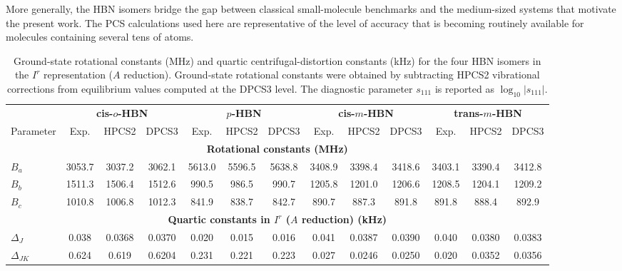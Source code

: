 \documentclass[aip,jcp,reprint,floatfix]{revtex4-2}
\begin{document}
More generally, the HBN isomers bridge the gap between classical
small-molecule benchmarks and the medium-sized systems that motivate
the present work. The PCS calculations used here are representative of
the level of accuracy that is becoming routinely available for
molecules containing several tens of atoms.

\begin{table}[t]
\centering
\scriptsize
\setlength{\tabcolsep}{4pt}

\caption{Ground-state rotational constants (MHz) and quartic
centrifugal-distortion constants (kHz) for the four HBN isomers in the
$I^r$ representation ($A$ reduction). Ground-state rotational
constants were obtained by subtracting HPCS2 vibrational corrections
from equilibrium values computed at the DPCS3 level. The diagnostic
parameter $s_{111}$ is reported as $\log_{10}|s_{111}|$.}

\begin{tabular}{lccc ccc ccc ccc}
\toprule
& \multicolumn{3}{c}{\textbf{cis-$o$-HBN}}
& \multicolumn{3}{c}{\textbf{$p$-HBN}}
& \multicolumn{3}{c}{\textbf{cis-$m$-HBN}}
& \multicolumn{3}{c}{\textbf{trans-$m$-HBN}} \\
\cmidrule(lr){2-4}
\cmidrule(lr){5-7}
\cmidrule(lr){8-10}
\cmidrule(lr){11-13}
Parameter
& Exp. & HPCS2 & DPCS3
& Exp. & HPCS2 & DPCS3
& Exp. & HPCS2 & DPCS3
& Exp. & HPCS2 & DPCS3 \\
\midrule

\multicolumn{13}{c}{\textbf{Rotational constants (MHz)}} \\

$B_a$ & 3053.7 & 3037.2 & 3062.1
& 5613.0 & 5596.5 & 5638.8
& 3408.9 & 3398.4 & 3418.6
& 3403.1 & 3390.4 & 3412.8 \\

$B_b$ & 1511.3 & 1506.4 & 1512.6
& 990.5 & 986.5 & 990.7
& 1205.8 & 1201.0 & 1206.6
& 1208.5 & 1204.1 & 1209.2 \\

$B_c$ & 1010.8 & 1006.8 & 1012.3
& 841.9 & 838.7 & 842.7
& 890.7 & 887.3 & 891.8
& 891.8 & 888.4 & 892.9 \\

\midrule
\multicolumn{13}{c}{\textbf{Quartic constants in $I^r$ ($A$ reduction) (kHz)}} \\

$\Delta_J$ & 0.038 & 0.0368 & 0.0370
& 0.020 & 0.015 & 0.016
& 0.041 & 0.0387 & 0.0390
& 0.040 & 0.0380 & 0.0383 \\

$\Delta_{JK}$ & 0.624 & 0.619 & 0.6204
& 0.231 & 0.221 & 0.223
& 0.027 & 0.0246 & 0.0250
& 0.020 & 0.0352 & 0.0356 \\


\end{tabular}
\end{table}
\end{document}
